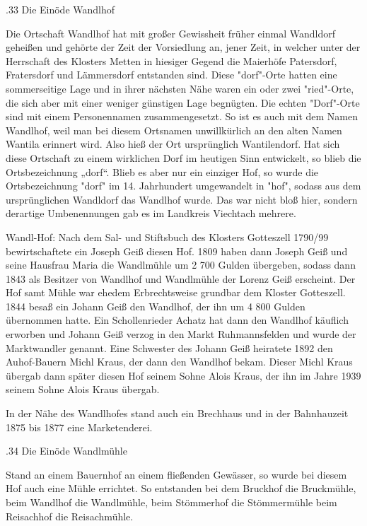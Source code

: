 .33 Die Einöde Wandlhof

Die Ortschaft Wandlhof hat mit großer Gewissheit früher einmal Wandldorf
geheißen und gehörte der Zeit der Vorsiedlung an, jener Zeit, in welcher unter
der Herrschaft des Klosters Metten in hiesiger Gegend die Maierhöfe Patersdorf,
Fratersdorf und Lämmersdorf entstanden sind. Diese "dorf"-Orte hatten eine
sommerseitige Lage und in ihrer nächsten Nähe waren ein oder zwei "ried"-Orte,
die sich aber mit einer weniger günstigen Lage begnügten. Die echten "Dorf"-Orte
sind mit einem Personennamen zusammengesetzt. So ist es auch mit dem Namen
Wandlhof, weil man bei diesem Ortsnamen unwillkürlich an den alten Namen Wantila
erinnert wird. Also hieß der Ort ursprünglich Wantilendorf. Hat sich diese
Ortschaft zu einem wirklichen Dorf im heutigen Sinn entwickelt, so blieb die
Ortsbezeichnung „dorf“. Blieb es aber nur ein einziger Hof, so wurde die
Ortsbezeichnung "dorf" im 14. Jahrhundert umgewandelt in "hof", sodass aus dem
ursprünglichen Wandldorf das Wandlhof wurde. Das war nicht bloß hier, sondern
derartige Umbenennungen gab es im Landkreis Viechtach mehrere.

Wandl-Hof: Nach dem Sal- und Stiftsbuch des Klosters Gotteszell 1790/99
bewirtschaftete ein Joseph Geiß diesen Hof. 1809 haben dann Joseph Geiß und
seine Hausfrau Maria die Wandlmühle um 2 700 Gulden übergeben, sodass dann 1843
als Besitzer von Wandlhof und Wandlmühle der Lorenz Geiß erscheint. Der Hof samt
Mühle war ehedem Erbrechtsweise grundbar dem Kloster Gotteszell. 1844 besaß ein
Johann Geiß den Wandlhof, der ihn um 4 800 Gulden übernommen hatte. Ein
Schollenrieder Achatz hat dann den Wandlhof käuflich erworben und Johann Geiß
verzog in den Markt Ruhmannsfelden und wurde der Marktwandler genannt. Eine
Schwester des Johann Geiß heiratete 1892 den Auhof-Bauern Michl Kraus, der dann
den Wandlhof bekam. Dieser Michl Kraus übergab dann später diesen Hof seinem
Sohne Alois Kraus, der ihn im Jahre 1939 seinem Sohne Alois Kraus übergab.

In der Nähe des Wandlhofes stand auch ein Brechhaus und in der Bahnhauzeit 1875
bis 1877 eine Marketenderei.

.34 Die Einöde Wandlmühle

Stand an einem Bauernhof an einem fließenden Gewässer, so wurde bei diesem Hof
auch eine Mühle errichtet. So entstanden bei dem Bruckhof die Bruckmühle, beim
Wandlhof die Wandlmühle, beim Stömmerhof die Stömmermühle beim Reisachhof die
Reisachmühle.

